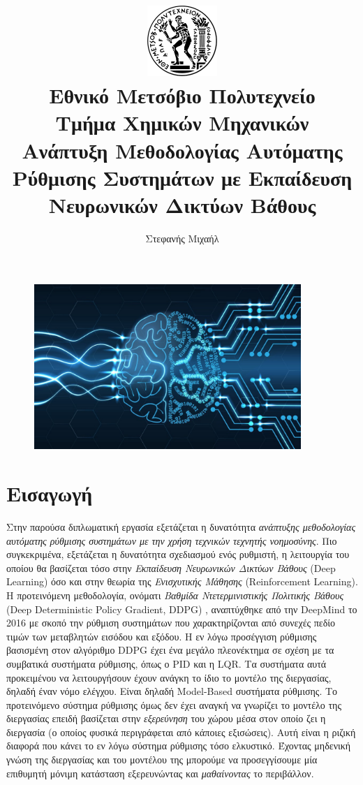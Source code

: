 \documentclass[11pt]{article} %
\title{
    {\includegraphics[width=0.2\textwidth]{emp.jpg}}\\
    {\large  Εθνικό Μετσόβιο Πολυτεχνείο}\\
    {\large  Τμήμα Χημικών Μηχανικών}\\
    {Ανάπτυξη Μεθοδολογίας Αυτόματης Ρύθμισης Συστημάτων με Εκπαίδευση Νευρωνικών Δικτύων Βάθους}\\
}
\author{Στεφανής Μιχαήλ}
\numberwithin{equation}{subsection}
\begin{document}
\maketitle
\begin{figure}[H]
    \centering
    \includegraphics[width=0.9\textwidth]{intro.jpeg}
\end{figure}
\newpage

\tableofcontents



\newpage






\section{Εισαγωγή}
Στην παρούσα διπλωματική εργασία εξετάζεται η δυνατότητα \textit{ανάπτυξης μεθοδολογίας αυτόματης ρύθμισης συστημάτων με την χρήση τεχνικών τεχνητής νοημοσύνης}. Πιο συγκεκριμένα, εξετάζεται η δυνατότητα σχεδιασμού ενός ρυθμιστή, η λειτουργία του οποίου θα βασίζεται τόσο στην \textit{Εκπαίδευση Νευρωνικών Δικτύων Βάθους} (Deep Learning) όσο και στην θεωρία της \textit{Ενισχυτικής Μάθησης} (Reinforcement Learning). Η προτεινόμενη μεθοδολογία, ονόματι \textit{Βαθμίδα Ντετερμινιστικής Πολιτικής Βάθους} (Deep Deterministic Policy Gradient, DDPG) \cite{deepmind}, αναπτύχθηκε από την DeepMind το 2016 με σκοπό την ρύθμιση συστημάτων που χαρακτηρίζονται από συνεχές πεδίο τιμών των μεταβλητών εισόδου και εξόδου. Η εν λόγω προσέγγιση ρύθμισης βασισμένη στον αλγόριθμο DDPG έχει ένα μεγάλο πλεονέκτημα σε σχέση με τα συμβατικά συστήματα ρύθμισης, όπως ο PID και η LQR. Τα συστήματα αυτά προκειμένου να λειτουργήσουν έχουν ανάγκη το ίδιο το μοντέλο της διεργασίας, δηλαδή έναν νόμο ελέγχου. Είναι δηλαδή Model-Based συστήματα ρύθμισης. Το προτεινόμενο σύστημα ρύθμισης όμως δεν έχει αναγκή να γνωρίζει το μοντέλο της διεργασίας επειδή βασίζεται στην \textit{εξερεύνηση} του χώρου μέσα στον οποίο ζει η διεργασία (ο οποίος φυσικά περιγράφεται από κάποιες εξισώσεις). Αυτή είναι η ριζική διαφορά που κάνει το εν λόγω σύστημα ρύθμισης τόσο ελκυστικό. Έχοντας μηδενική γνώση της διεργασίας και του μοντέλου της μπορούμε να προσεγγίσουμε μία επιθυμητή μόνιμη κατάσταση εξερευνώντας και \textit{μαθαίνοντας} το περιβάλλον.\\
\end{document}
